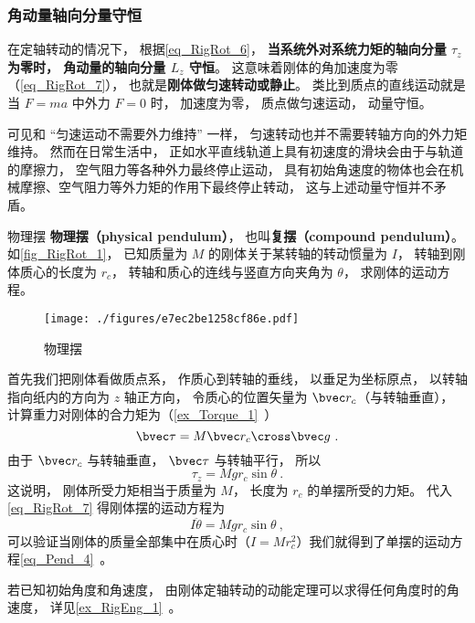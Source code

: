 \subsubsection{角动量轴向分量守恒}
在定轴转动的情况下， 根据\autoref{eq_RigRot_6}， \textbf{当系统外对系统力矩的轴向分量 $\tau_z$ 为零时， 角动量的轴向分量 $L_z$ 守恒}。  这意味着刚体的角加速度为零（\autoref{eq_RigRot_7}）， 也就是\textbf{刚体做匀速转动或静止}。 类比到质点的直线运动就是当 $F = ma$ 中外力 $F = 0$ 时， 加速度为零， 质点做匀速运动， 动量守恒。

可见和 “匀速运动不需要外力维持” 一样， 匀速转动也并不需要转轴方向的外力矩维持。 然而在日常生活中， 正如水平直线轨道上具有初速度的滑块会由于与轨道的摩擦力， 空气阻力等各种外力最终停止运动， 具有初始角速度的物体也会在机械摩擦、空气阻力等外力矩的作用下最终停止转动， 这与上述动量守恒并不矛盾。

\begin{example}{物理摆}\label{ex_RigRot_1}
\textbf{物理摆（physical pendulum）}， 也叫\textbf{复摆（compound pendulum）}。 如\autoref{fig_RigRot_1}， 已知质量为 $M$ 的刚体关于某转轴的转动惯量为 $I$， 转轴到刚体质心的长度为 $r_c$， 转轴和质心的连线与竖直方向夹角为 $\theta$， 求刚体的运动方程。
\begin{figure}[ht]
\centering
\texttt{[image: ./figures/e7ec2be1258cf86e.pdf]}
\caption{物理摆} \label{fig_RigRot_1}
\end{figure}

首先我们把刚体看做质点系， 作质心到转轴的垂线， 以垂足为坐标原点， 以转轴指向纸内的方向为 $z$ 轴正方向， 令质心的位置矢量为 $\bvec r_c$（与转轴垂直）， 计算重力对刚体的合力矩为（\autoref{ex_Torque_1}~）
\begin{equation}\label{eq_RigRot_14}
\bvec \tau = M \bvec r_c \cross \bvec g~.
\end{equation}
由于 $\bvec r_c$ 与转轴垂直， $\bvec \tau$ 与转轴平行， 所以
\begin{equation}
\tau_z = Mg r_c \sin\theta~.
\end{equation}
这说明， 刚体所受力矩相当于质量为 $M$， 长度为 $r_c$ 的单摆所受的力矩。 代入\autoref{eq_RigRot_7} 得刚体摆的运动方程为
\begin{equation}
I\ddot \theta = Mg r_c \sin\theta~,
\end{equation}
可以验证当刚体的质量全部集中在质心时（$I = Mr_c^2$）我们就得到了单摆的运动方程\autoref{eq_Pend_4}~。

若已知初始角度和角速度， 由刚体定轴转动的动能定理可以求得任何角度时的角速度， 详见\autoref{ex_RigEng_1}~。
\end{example}

